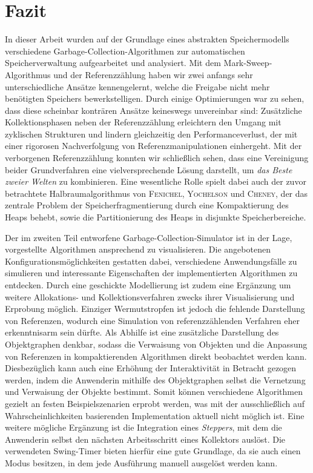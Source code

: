 \chapter{Fazit}
\label{cha:fazit}

In dieser Arbeit wurden auf der Grundlage eines abstrakten Speichermodells verschiedene Garbage-Collection-Algorithmen zur automatischen Speicherverwaltung aufgearbeitet und analysiert.
Mit dem Mark-Sweep-Algorithmus und der Referenzzählung haben wir zwei anfangs sehr unterschiedliche Ansätze kennengelernt, welche die Freigabe nicht mehr benötigten Speichers bewerkstelligen.
Durch einige Optimierungen war zu sehen, dass diese scheinbar konträren Ansätze keineswegs unvereinbar sind:
Zusätzliche Kollektionsphasen neben der Referenzzählung erleichtern den Umgang mit zyklischen Strukturen und lindern gleichzeitig den Performanceverlust, der mit einer rigorosen Nachverfolgung von Referenzmanipulationen einhergeht.
Mit der verborgenen Referenzzählung konnten wir schließlich sehen, dass eine Vereinigung beider Grundverfahren eine vielversprechende Lösung darstellt, um \textit{das Beste zweier Welten} zu kombinieren.
Eine wesentliche Rolle spielt dabei auch der zuvor betrachtete Halbraumalgorithmus von \textsc{Fenichel}, \textsc{Yochelson} und \textsc{Cheney}, der das zentrale Problem der Speicherfragmentierung durch eine Kompaktierung des Heaps behebt, sowie die Partitionierung des Heaps in disjunkte Speicherbereiche.

Der im zweiten Teil entworfene Garbage-Collection-Simulator ist in der Lage, vorgestellte Algorithmen ansprechend zu visualisieren.
Die angebotenen Konfigurationsmöglichkeiten gestatten dabei, verschiedene Anwendungsfälle zu simulieren und interessante Eigenschaften der implementierten Algorithmen zu entdecken.
Durch eine geschickte Modellierung ist zudem eine Ergänzung um weitere Allokations- und Kollektionsverfahren zwecks ihrer Visualisierung und Erprobung möglich.
Einziger Wermutstropfen ist jedoch die fehlende Darstellung von Referenzen, wodurch eine Simulation von referenzzählenden Verfahren eher erkenntnisarm sein dürfte.
Als Abhilfe ist eine zusätzliche Darstellung des Objektgraphen denkbar, sodass die Verwaisung von Objekten und die Anpassung von Referenzen in kompaktierenden Algorithmen direkt beobachtet werden kann.
Diesbezüglich kann auch eine Erhöhung der Interaktivität in Betracht gezogen werden, indem die Anwenderin mithilfe des Objektgraphen selbst die Vernetzung und Verwaisung der Objekte bestimmt.
Somit können verschiedene Algorithmen gezielt an festen Beispielszenarien erprobt werden, was mit der ausschließlich auf Wahrscheinlichkeiten basierenden Implementation aktuell nicht möglich ist.
Eine weitere mögliche Ergänzung ist die Integration eines \textit{Steppers}, mit dem die Anwenderin selbst den nächsten Arbeitsschritt eines Kollektors auslöst.
Die verwendeten Swing-Timer bieten hierfür eine gute Grundlage, da sie auch einen Modus besitzen, in dem jede Ausführung manuell ausgelöst werden kann.

